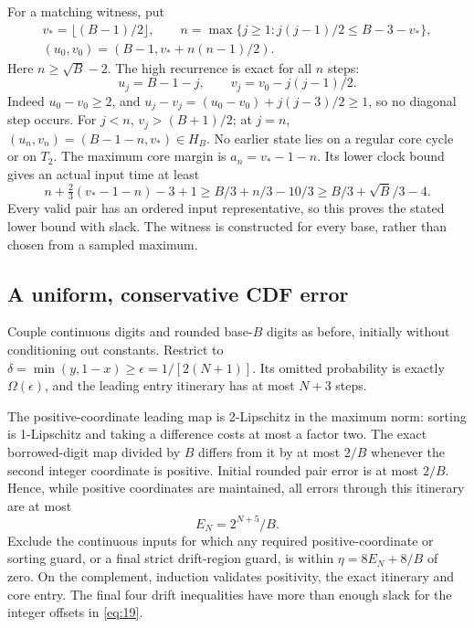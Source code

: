 \documentclass[11pt]{amsart}
\begin{document}
For a matching witness, put \begin{equation}\label{eq:37}
\begin{gathered}
 v_* =\lfloor(B-1)/2\rfloor,\qquad
 n=\max\{j\ge1:j(j-1)/2\le B-3-v_*\},\\
 (u_0,v_0)=(B-1,v_*+n(n-1)/2).
 \end{gathered}
\end{equation} Here \(n\ge\sqrt B-2\). The high recurrence is exact for all \(n\) steps: \[u_j=B-1-j,\qquad v_j=v_0-j(j-1)/2.\] Indeed \(u_0-v_0\ge2\), and \(u_j-v_j=(u_0-v_0)+j(j-3)/2\ge1\), so no diagonal step occurs. For \(j<n\), \(v_j>(B+1)/2\); at \(j=n\), \((u_n,v_n)=(B-1-n,v_*)\in H_B\). No earlier state lies on a regular core cycle or on \(T_2\). The maximum core margin is \(a_n=v_*-1-n\). Its lower clock bound gives an actual input time at least \[n+\tfrac23(v_*-1-n)-3+1
 \ge B/3+n/3-10/3
 \ge B/3+\sqrt B/3-4.\] Every valid pair has an ordered input representative, so this proves the stated lower bound with slack. The witness is constructed for every base, rather than chosen from a sampled maximum.

\subsection{A uniform, conservative CDF error}

Couple continuous digits and rounded base-\(B\) digits as before, initially without conditioning out constants. Restrict to \(\delta=\min(y,1-x)\ge\epsilon=1/[2(N+1)]\). Its omitted probability is exactly \(\Omega(\epsilon)\), and the leading entry itinerary has at most \(N+3\) steps.

The positive-coordinate leading map is 2-Lipschitz in the maximum norm: sorting is 1-Lipschitz and taking a difference costs at most a factor two. The exact borrowed-digit map divided by \(B\) differs from it by at most \(2/B\) whenever the second integer coordinate is positive. Initial rounded pair error is at most \(2/B\). Hence, while positive coordinates are maintained, all errors through this itinerary are at most \begin{equation}\label{eq:38}
E_N=2^{N+5}/B.
\end{equation} Exclude the continuous inputs for which any required positive-coordinate or sorting guard, or a final strict drift-region guard, is within \(\eta=8E_N+8/B\) of zero. On the complement, induction validates positivity, the exact itinerary and core entry. The final four drift inequalities have more than enough slack for the integer offsets in \eqref{eq:19}.
\end{document}
